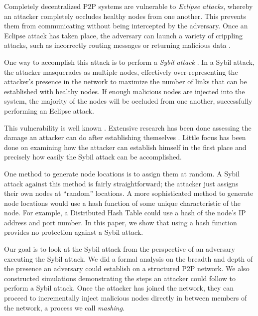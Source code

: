 \documentclass[11pt,conference]{IEEEtran}
\begin{document}
Completely decentralized P2P systems are vulnerable to \textit{Eclipse attacks}, whereby an attacker completely occludes healthy nodes from one another.
This prevents them from communicating without being intercepted by the adversary.
Once an Eclipse attack has taken place, the adversary can launch a variety of crippling attacks, such as incorrectly routing messages or returning malicious data \cite{srivatsa2004vulnerabilities}.

One way to accomplish this attack is to perform a \emph{Sybil attack} \cite{sybil}.
In a Sybil attack, the attacker masquerades as multiple nodes, effectively over-representing the attacker's presence in the network to maximize the number of links that can be established with healthy nodes.
If enough malicious nodes are injected into the system, the majority of the nodes will be occluded from one another, successfully performing an Eclipse attack.

This vulnerability is well known \cite{dhtsec}. 
Extensive research has been done assessing the damage an attacker can do after establishing themselves \cite{srivatsa2004vulnerabilities}.
Little focus has been done on examining how the attacker can establish himself in the first place and precisely how easily the Sybil attack can be accomplished.

One method to generate node locations is to assign them at random.
A Sybil attack against this method is fairly straightforward; the attacker just assigns their own nodes at ``random'' locations.
A more sophisticated method to generate node locations would use a hash function of some unique characteristic of the node.
For example, a Distributed Hash Table could use a hash of the node's IP address and port number.
In this paper, we show that using a hash function provides no protection against a Sybil attack.

Our goal is to look at the Sybil attack from the perspective of an adversary executing the Sybil attack.
We did a formal analysis on the breadth and depth of the presence an adversary could establish on a structured P2P network.
We also constructed simulations demonstrating the steps an attacker could follow to perform a Sybil attack.
Once the attacker has joined the network, they can proceed to incrementally inject malicious nodes directly in between members of the network, a process we call \textit{mashing}.
\end{document}
